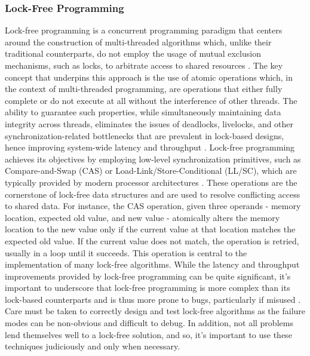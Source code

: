 \documentclass{article}
\theoremstyle{break}
\begin{document}
\subsubsection*{Lock-Free Programming}

Lock-free programming is a concurrent programming paradigm that centers around the construction of multi-threaded algorithms which, unlike their traditional counterparts, do not employ the usage of mutual exclusion mechanisms, such as locks, to arbitrate access to shared resources \cite{herlihy}. The key concept that underpins this approach is the use of atomic operations which, in the context of multi-threaded programming, are operations that either fully complete or do not execute at all without the interference of other threads. The ability to guarantee such properties, while simultaneously maintaining data integrity across threads, eliminates the issues of deadlocks, livelocks, and other synchronization-related bottlenecks that are prevalent in lock-based designs, hence improving system-wide latency and throughput \cite{fraser}. Lock-free programming achieves its objectives by employing low-level synchronization primitives, such as Compare-and-Swap (CAS) or Load-Link/Store-Conditional (LL/SC), which are typically provided by modern processor architectures \cite{anderson}. These operations are the cornerstone of lock-free data structures and are used to resolve conflicting access to shared data. For instance, the CAS operation, given three operands - memory location, expected old value, and new value - atomically alters the memory location to the new value only if the current value at that location matches the expected old value. If the current value does not match, the operation is retried, usually in a loop until it succeeds. This operation is central to the implementation of many lock-free algorithms. While the latency and throughput improvements provided by lock-free programming can be quite significant, it's important to underscore that lock-free programming is more complex than its lock-based counterparts and is thus more prone to bugs, particularly if misused \cite{mckenney}. Care must be taken to correctly design and test lock-free algorithms as the failure modes can be non-obvious and difficult to debug. In addition, not all problems lend themselves well to a lock-free solution, and so, it's important to use these techniques judiciously and only when necessary.
\end{document}
